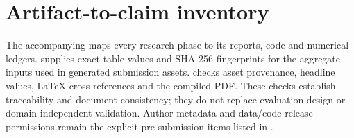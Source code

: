 \section{Artifact-to-claim inventory}
The accompanying  maps every research phase to its reports, code and numerical ledgers.  supplies exact table values and SHA-256 fingerprints for the aggregate inputs used in generated submission assets.  checks asset provenance, headline values, LaTeX cross-references and the compiled PDF. These checks establish traceability and document consistency; they do not replace evaluation design or domain-independent validation. Author metadata and data/code release permissions remain the explicit pre-submission items listed in .


